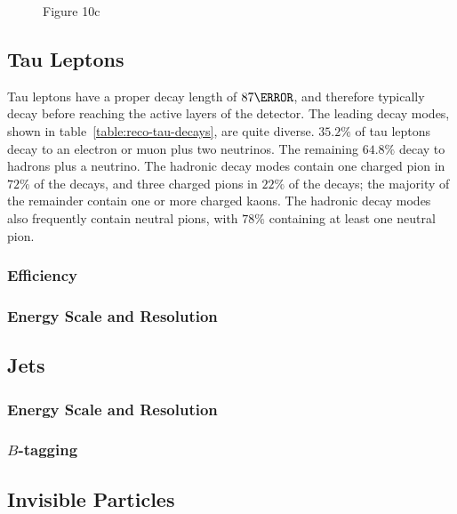\begin{figure}
	Figure 10c
	\label{fig:reco-muon-momentum-corrections}
\end{figure}



\subsection{Tau Leptons}\label{sec:event-reconstruction-taus}
Tau leptons have a proper decay length of $87 \um$, and therefore typically decay before reaching the active layers of the detector. The leading decay modes, shown in table~\ref{table:reco-tau-decays}, are quite diverse. $35.2\%$ of tau leptons decay to an electron or muon plus two neutrinos. The remaining $64.8\%$ decay to hadrons plus a neutrino. The hadronic decay modes contain one charged pion in $72\%$ of the decays, and three charged pions in $22\%$ of the decays; the majority of the remainder contain one or more charged kaons. The hadronic decay modes also frequently contain neutral pions, with $78\%$ containing at least one neutral pion. 




\subsubsection{Efficiency}

\subsubsection{Energy Scale and Resolution}



\subsection{Jets}\label{sec:event-reconstruction-jets}


\subsubsection{Energy Scale and Resolution}

\subsubsection{$B$-tagging}\label{sec:event-reconstruction-bjets}

\subsection{Invisible Particles}\label{sec:event-reconstruction-met}

